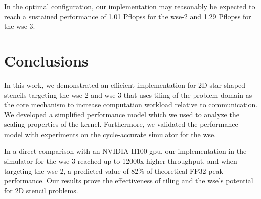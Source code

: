 In the optimal configuration, our implementation may reasonably be expected to reach a sustained performance of 1.01 P\acp{flops} for the \ac{wse}-2 and 1.29 P\acp{flops} for the \ac{wse}-3.

\section{Conclusions}
In this work, we demonstrated an efficient implementation for 2D star-shaped stencils targeting the \ac{wse}-2 and \ac{wse}-3 that uses tiling of the problem domain as the core mechanism to increase computation workload relative to communication. We developed a simplified performance model which we used to analyze the scaling properties of the kernel. Furthermore, we validated the performance model with experiments on the cycle-accurate simulator for the \ac{wse}.

In a direct comparison with an NVIDIA H100 \ac{gpu}, our implementation in the simulator for the \ac{wse}-3 reached up to 12000x higher throughput, and when targeting the \ac{wse}-2, a predicted value of 82\% of theoretical FP32 peak performance. Our results prove the effectiveness of tiling and the \ac{wse}'s potential for 2D stencil problems.